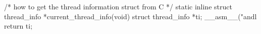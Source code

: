 \documentclass[varwidth=33em,crop]{standalone}
\begin{document}
\begin{ccode}
/* how to get the thread information struct from C */
static inline struct thread_info *current_thread_info(void)
{
  struct thread_info *ti;
  __asm__("andl %
  return ti;
}  
\end{ccode}
\end{document}
